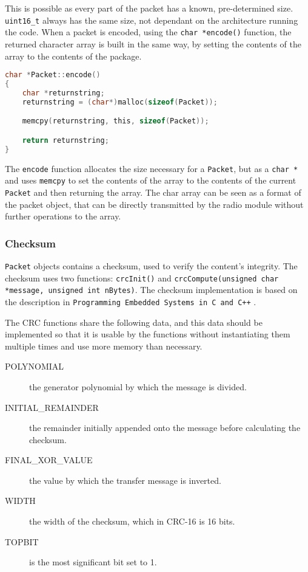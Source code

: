 This is possible as every part of the packet has a known, pre-determined size. \texttt{uint16\_t} always has the same size, not dependant on the architecture running the code. When a packet is encoded, using the \texttt{char *encode()} function, the returned character array is built in the same way, by setting the contents of the array to the contents of the package.

\begin{lstlisting}[language=C]
char *Packet::encode()
{
    char *returnstring;
    returnstring = (char*)malloc(sizeof(Packet));

    memcpy(returnstring, this, sizeof(Packet));

    return returnstring;
}
\end{lstlisting}
The \texttt{encode} function allocates the size necessary for a \texttt{Packet}, but as a \texttt{char *} and uses \texttt{memcpy} to set the contents of the array to the contents of the current \texttt{Packet} and then returning the array. The char array can be seen as a format of the packet object, that can be directly transmitted by the radio module without further operations to the array.

\subsubsection{Checksum}
\texttt{Packet} objects contains a checksum, used to verify the content's integrity. The checksum uses two functions: \texttt{crcInit()} and \texttt{crcCompute(unsigned char *message, unsigned int nBytes)}. The checksum implementation is based on the description in \texttt{Programming Embedded Systems in C and C++} \cite{crcCode}.

The CRC functions share the following data, and this data should be implemented so that it is usable by the functions without instantiating them multiple times and use more memory than necessary.

\begin{description}
	\item[POLYNOMIAL] the generator polynomial by which the message is divided.
	\item[INITIAL\_REMAINDER] the remainder initially appended onto the message before calculating the checksum.
	\item[FINAL\_XOR\_VALUE] the value by which the transfer message is inverted.
	\item[WIDTH] the width of the checksum, which in CRC-16 is 16 bits.
	\item[TOPBIT] is the most significant bit set to 1.
\end{description}

